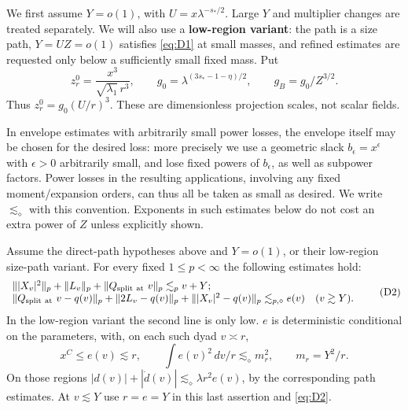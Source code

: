 We first assume $Y=o(1)$, with $U=x\lambda^{-s_*/2}$.  Large $Y$ and
multiplier changes are treated separately.  We will also use a
\textbf{low-region variant}: the path is a size path,
$Y=UZ=o(1)$ satisfies \eqref{eq:D1} at small masses, and refined estimates
are requested only below a sufficiently small fixed mass.  Put
\begin{equation*}
 z_r^0=\frac{x^3}{\sqrt{\lambda_1}\,r^3},\qquad
 g_0=\lambda^{(3s_*-1-\eta)/2},\qquad g_B=g_0/Z^{3/2}.
\end{equation*}
Thus $z_r^0=g_0(U/r)^3$.  These are dimensionless projection scales,
not scalar fields.

In envelope estimates with arbitrarily small power losses, the envelope itself may be chosen for the desired loss: more precisely we use a geometric slack \(b_\epsilon=x^\epsilon\) with \(\epsilon>0\) arbitrarily small, and lose fixed powers of \(b_\epsilon\), as well as subpower factors. Power losses in the resulting applications, involving any fixed moment/expansion orders, can thus all be taken as small as desired. We write \(\lesssim_\diamond\) with this convention. Exponents in such estimates below do not cost an extra power of \(Z\) unless explicitly shown.

\begin{proposition}\label{prop:statistics-pointwise}
Assume the direct-path hypotheses above and $Y=o(1)$, or their low-region
size-path variant.  For every fixed $1\le p<\infty$ the following estimates hold:
\begin{equation}
\begin{array}{ll}
 \||X_v|^2\|_p+\|L_v\|_p+\|Q_{\rm split\ at\ }v\|_p\lesssim_p v+Y;\\
 \|Q_{\rm split\ at\ }v-q(v)\|_p+
 \|2L_v-q(v)\|_p+\||X_v|^2-q(v)\|_p\lesssim_{p,\diamond} e(v)
       & (v\gtrsim Y).
\end{array}                                                        \tag{D2}\label{eq:D2}
\end{equation}
In the low-region variant the second line is only low. \(e\) is deterministic conditional on the parameters, with, on each such dyad \(v\asymp r\),
\begin{equation*}
x^C\le e(v)\lesssim r,\qquad
 \int e(v)^2\,dv/r\lesssim_\diamond m_r^2,\qquad m_r=Y^2/r.
\end{equation*}
On those regions \(|d(v)|+|\dot d(v)|\lesssim_\diamond\lambda r^2 e(v)\), by the corresponding path estimates. At \(v\lesssim Y\) use \(r=e=Y\) in this last assertion and \eqref{eq:D2}.
\end{proposition}

